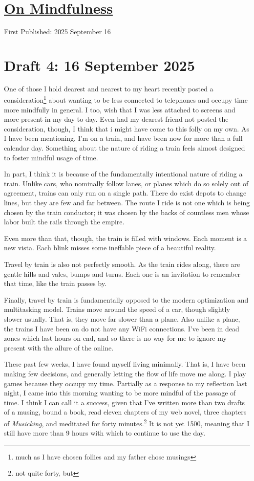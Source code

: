 \documentclass[12pt]{article}
\renewcommand{\,}{\textsuperscript{,}}
\begin{document}
  
\doublespacing  
\section{\href{mindfulness.html}{On Mindfulness}}  
First Published: 2025 September 16

\section{Draft 4: 16 September 2025}
One of those I hold dearest and nearest to my heart recently posted a consideration\footnote{much as I have chosen follies and my father chose musings} about wanting to be less connected to telephones and occupy time more mindfully in general.
I too, wish that I was less attached to screens and more present in my day to day.
Even had my dearest friend not posted the consideration, though, I think that i might have come to this folly on my own.
As I have been mentioning, I'm on a train, and have been now for more than a full calendar day.
Something about the nature of riding a train feels almost designed to foster mindful usage of time.

In part, I think it is because of the fundamentally intentional nature of riding a train.
Unlike cars, who nominally follow lanes, or planes which do so solely out of agreement, trains can only run on a single path.
There do exist depots to change lines, but they are few and far between.
The route I ride is not one which is being chosen by the train conductor; it was chosen by the backs of countless men whose labor built the rails through the empire.

Even more than that, though, the train is filled with windows.
Each moment is a new vista.
Each blink misses some ineffable piece of a beautiful reality.

Travel by train is also not perfectly smooth.
As the train rides along, there are gentle hills and vales, bumps and turns.
Each one is an invitation to remember that time, like the train passes by.

Finally, travel by train is fundamentally opposed to the modern optimization and multitasking model.
Trains move around the speed of a car, though slightly slower usually.
That is, they move far slower than a plane.
Also unlike a plane, the trains I have been on do not have any WiFi connections.
I've been in dead zones which last hours on end, and so there is no way for me to ignore my present with the allure of the online.

These past few weeks, I have found myself living minimally.
That is, I have been making few decisions, and generally letting the flow of life move me along.
I play games because they occupy my time.
Partially as a response to my reflection last night, I came into this morning wanting to be more mindful of the passage of time.
I think I can call it a success, given that I've written more than two drafts of a musing, bound a book, read eleven chapters of my web novel, three chapters of \textit{Musicking}, and meditated for forty minutes.\footnote{not quite forty, but}
It is not yet 1500, meaning that I still have more than 9 hours with which to continue to use the day.
\end{document}
